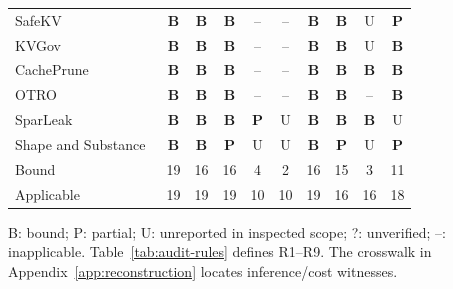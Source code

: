 \begin{table}[t]
\begin{tabularx}{\columnwidth}{@{}Y*{9}{c}@{}}
SafeKV~\cite{chu2025safekv} & \textbf{B} & \textbf{B} & \textbf{B} & -- & -- & \textbf{B} & \textbf{B} & U & \textbf{P}\\
KVGov~\cite{addagada2026kvgov} & \textbf{B} & \textbf{B} & \textbf{B} & -- & -- & \textbf{B} & \textbf{B} & U & \textbf{B}\\
CachePrune~\cite{wu2026cacheprune} & \textbf{B} & \textbf{B} & \textbf{B} & -- & -- & \textbf{B} & \textbf{B} & \textbf{B} & \textbf{B}\\
OTRO~\cite{lee2026otro} & \textbf{B} & \textbf{B} & \textbf{B} & -- & -- & \textbf{B} & \textbf{B} & -- & \textbf{B}\\
SparLeak~\cite{chen2026sparleak} & \textbf{B} & \textbf{B} & \textbf{B} & \textbf{P} & U & \textbf{B} & \textbf{B} & \textbf{B} & U\\
Shape and Substance~\cite{hadad2026shape} & \textbf{B} & \textbf{B} & \textbf{P} & U & U & \textbf{B} & \textbf{P} & U & \textbf{P}\\
\midrule Bound & 19 & 16 & 16 & 4 & 2 & 16 & 15 & 3 & 11\\
Applicable & 19 & 19 & 19 & 10 & 10 & 19 & 16 & 16 & 18\\
\bottomrule\end{tabularx}
\par\smallskip\raggedright B: bound; P: partial; U: unreported in inspected scope; ?: unverified; --: inapplicable. Table~\ref{tab:audit-rules} defines R1--R9. The crosswalk in Appendix~\ref{app:reconstruction} locates inference/cost witnesses.
\end{table}
